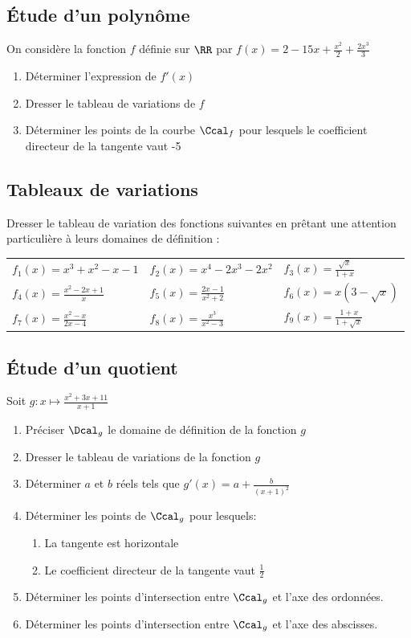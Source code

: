 \documentclass[oneside,12pt]{book}          %
\begin{document}
\subsection{Étude d'un polynôme}
On considère la fonction $f$ définie sur $\RR$ par $f(x)=2-15 x + \frac{x^2}{2} + \frac{2 x^3}{3}$
\begin{enumerate}
    \item Déterminer l'expression de $f'(x)$
    \item Dresser le tableau de variations de $f$
    \item Déterminer les points de la courbe $\Ccal_f$ pour lesquels le coefficient directeur de la tangente vaut -5
\end{enumerate}



\subsection{Tableaux de variations}
 Dresser le tableau de variation des fonctions suivantes en prêtant une attention particulière à leurs domaines de définition : \\
\renewcommand{\arraystretch}{1.4}
\begin{tabular}{p{} p{} p{}}
    $f_1(x)=x^3+x^2-x-1$ & $f_2(x)=x^4-2x^3-2x^2$ & $f_3(x)=\frac{\sqrt{x}}{1+x}$ \\
    $f_4(x)=\frac{x^2-2x+1}{x}$ & $f_5(x)=\frac{2x-1}{x^2+2}$ & $f_6(x)=x(3-\sqrt{x})$ \\
    $f_7(x)=\frac{x^2-x}{2x-4}$ & $f_8(x)=\frac{x^3}{x^2-3}$ & $f_9(x)=\frac{1+x}{1+\sqrt{x}}$
\end{tabular}



\subsection{Étude d'un quotient}
Soit $g:x\mapsto\frac{x^2+3x+11}{x+1}$
\begin{enumerate}
    \item Préciser $\Dcal_g$ le domaine de définition de la fonction $g$
    \item Dresser le tableau de variations de la fonction $g$
    \item Déterminer $a$ et $b$ réels tels que $g'(x)=a+\frac{b}{(x+1)^2}$
    \item Déterminer les points de $\Ccal_g$ pour lesquels:
    \begin{enumerate}
        \item La tangente est horizontale
        \item Le coefficient directeur de la tangente vaut $\frac{1}{2}$
    \end{enumerate}
    \item Déterminer les points d'intersection entre $\Ccal_g$ et l'axe des ordonnées.
    \item Déterminer les points d'intersection entre $\Ccal_g$ et l'axe des abscisses.
\end{enumerate}
\end{document}
